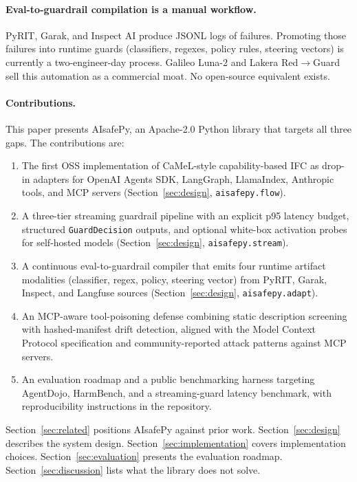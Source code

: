 \paragraph{Eval-to-guardrail compilation is a manual workflow.}
PyRIT, Garak, and Inspect AI produce JSONL logs of failures.
Promoting those failures into runtime guards (classifiers, regexes,
policy rules, steering vectors) is currently a two-engineer-day
process. Galileo Luna-2 and Lakera Red$\rightarrow$Guard sell this
automation as a commercial moat. No open-source equivalent exists.

\paragraph{Contributions.} This paper presents AIsafePy, an
Apache-2.0 Python library that targets all three gaps. The
contributions are:

\begin{enumerate}[leftmargin=2em, itemsep=0.25em]
  \item The first OSS implementation of CaMeL-style capability-based
    IFC as drop-in adapters for OpenAI Agents SDK, LangGraph,
    LlamaIndex, Anthropic tools, and MCP servers
    (Section~\ref{sec:design}, \texttt{aisafepy.flow}).

  \item A three-tier streaming guardrail pipeline with an explicit
    p95 latency budget, structured \texttt{GuardDecision} outputs,
    and optional white-box activation probes for self-hosted models
    (Section~\ref{sec:design}, \texttt{aisafepy.stream}).

  \item A continuous eval-to-guardrail compiler that emits four
    runtime artifact modalities (classifier, regex, policy, steering
    vector) from PyRIT, Garak, Inspect, and Langfuse sources
    (Section~\ref{sec:design}, \texttt{aisafepy.adapt}).

  \item An MCP-aware tool-poisoning defense combining static
    description screening with hashed-manifest drift detection,
    aligned with the Model Context Protocol specification
    \citep{mcpspec} and community-reported attack patterns
    against MCP servers.

  \item An evaluation roadmap and a public benchmarking harness
    targeting AgentDojo, HarmBench, and a streaming-guard latency
    benchmark, with reproducibility instructions in the repository.
\end{enumerate}

Section~\ref{sec:related} positions AIsafePy against prior work.
Section~\ref{sec:design} describes the system design.
Section~\ref{sec:implementation} covers implementation choices.
Section~\ref{sec:evaluation} presents the evaluation roadmap.
Section~\ref{sec:discussion} lists what the library does not solve.
